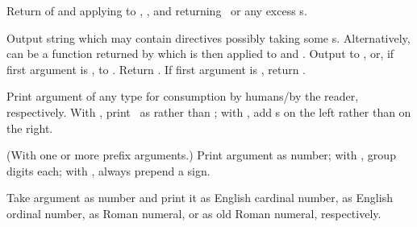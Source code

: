\begin{LIST}{1cm}

  {
    Return  of  and 
    applying  to , , and
     returning \NIL\ or any excess s.
  }

  {
    Output string  which may
    contain \kwd{\TLD} directives possibly taking some
    s. Alternatively,  can be a function returned
    by  which is then applied to  and
    .  Output to ,  or,
    if first argument is \T, to . Return
    \retval{\NIL}.  If first argument is \NIL, return
    . 
  }

  \begin{LIST}{.5cm}

    {%
      Print argument of any type for consumption by humans/by the
      reader, respectively. With \kwd{:}, print \NIL\ as \LIT{()} rather
      than ; with , add s on the left
      rather than on the right.
    }
    
    {%
      (With one or more prefix arguments.) Print argument as number; with
      \KWD{:}, group digits  each; with ,
      always prepend a sign. 
    }

    {
      Take argument as number and print it as English cardinal number,
      as English ordinal number, as Roman numeral, or as old Roman
      numeral, respectively.
    }


\end{LIST}
\end{LIST}
